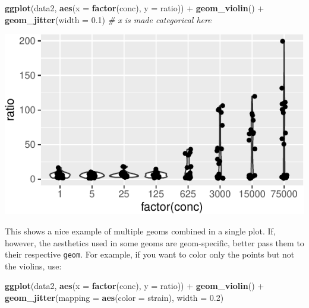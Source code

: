 \documentclass[]{book}
\newenvironment{Shaded}{}{}
\newcommand{\CommentTok}[1]{\textcolor[rgb]{0.38,0.63,0.69}{\textit{#1}}}
\newcommand{\DataTypeTok}[1]{\textcolor[rgb]{0.56,0.13,0.00}{#1}}
\newcommand{\FloatTok}[1]{\textcolor[rgb]{0.25,0.63,0.44}{#1}}
\newcommand{\KeywordTok}[1]{\textcolor[rgb]{0.00,0.44,0.13}{\textbf{#1}}}
\newcommand{\NormalTok}[1]{#1}
\newcommand{\OperatorTok}[1]{\textcolor[rgb]{0.40,0.40,0.40}{#1}}
\newcommand{\StringTok}[1]{\textcolor[rgb]{0.25,0.44,0.63}{#1}}
\begin{document}
\begin{Shaded}
\begin{Highlighting}[]
\KeywordTok{ggplot}\NormalTok{(data2, }\KeywordTok{aes}\NormalTok{(}\DataTypeTok{x =} \KeywordTok{factor}\NormalTok{(conc), }\DataTypeTok{y =}\NormalTok{ ratio)) }\OperatorTok{+}
\StringTok{  }\KeywordTok{geom_violin}\NormalTok{() }\OperatorTok{+}
\StringTok{  }\KeywordTok{geom_jitter}\NormalTok{(}\DataTypeTok{width =} \FloatTok{0.1}\NormalTok{)}
 \CommentTok{# x is made categorical here}
\end{Highlighting}
\end{Shaded}

\begin{center}\includegraphics[width=\textwidth]{TRES-Tidy-Tutorial_files/figure-latex/unnamed-chunk-122-1} \end{center}

This shows a nice example of multiple geoms combined in a single plot. If, however, the aesthetics used in some geoms are geom-specific, better pass them to their respective \texttt{geom}. For example, if you want to color only the points but not the violins, use:

\begin{Shaded}
\begin{Highlighting}[]
\KeywordTok{ggplot}\NormalTok{(data2, }\KeywordTok{aes}\NormalTok{(}\DataTypeTok{x =} \KeywordTok{factor}\NormalTok{(conc), }\DataTypeTok{y =}\NormalTok{ ratio)) }\OperatorTok{+}
\StringTok{  }\KeywordTok{geom_violin}\NormalTok{() }\OperatorTok{+}
\StringTok{  }\KeywordTok{geom_jitter}\NormalTok{(}\DataTypeTok{mapping =} \KeywordTok{aes}\NormalTok{(}\DataTypeTok{color =}\NormalTok{ strain), }\DataTypeTok{width =} \FloatTok{0.2}\NormalTok{)}
\end{Highlighting}
\end{Shaded}
\end{document}
